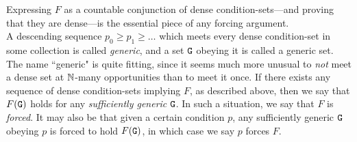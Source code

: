 \documentclass{amsart}
\begin{document}
	Expressing $F$ as a countable conjunction of dense condition-sets---and proving that they are dense---is the essential piece of any forcing argument.\\
	
	A descending sequence $p_0\geq p_1 \geq \dots$ which meets every dense condition-set in some collection is called \textit{generic}, and a set $\tt{G}$ obeying it is called a generic set. The name ``generic" is quite fitting, since it seems much more unusual to \textit{not} meet a dense set at $\mathbb{N}$-many opportunities than to meet it once. If there exists any sequence of dense condition-sets implying $F$, as described above, then we say that $F(\tt{G})$ holds for any \textit{sufficiently generic} $\tt{G}$. In such a situation, we say that $F$ is \textit{forced}. It may also be that given a certain condition $p$, any sufficiently generic $\tt{G}$ obeying $p$ is forced to hold $F(\tt{G})$, in which case we say $p$ forces $F$.
	
	
	
	
\end{document}
